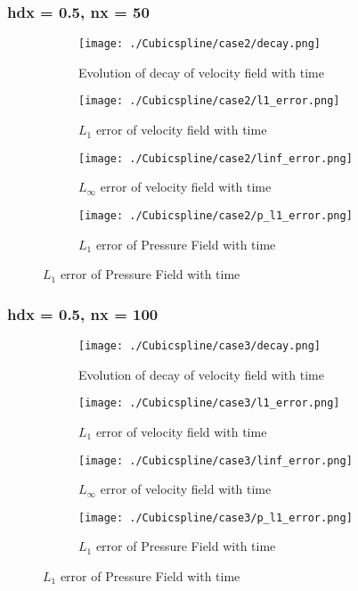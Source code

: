 \documentclass[11pt, a4paper]{article}
\begin{document}
\subsubsection{hdx = 0.5, nx = 50}
\begin{figure}[H]
\begin{subfigure}{0.48\textwidth}
\texttt{[image: ./Cubicspline/case2/decay.png]}
\caption{Evolution of decay of velocity field with time}
\end{subfigure}
\begin{subfigure}{0.48\textwidth}
\texttt{[image: ./Cubicspline/case2/l1\_error.png]}
\caption{$L_1$ error of velocity field with time}
\end{subfigure}
\medskip
\begin{subfigure}{0.48\textwidth}
\texttt{[image: ./Cubicspline/case2/linf\_error.png]}
\caption{$L_\infty$ error of velocity field with time}
\end{subfigure}
\begin{subfigure}{0.48\textwidth}
\texttt{[image: ./Cubicspline/case2/p\_l1\_error.png]}
\caption{$L_1$ error of Pressure Field with time}
\end{subfigure}
\end{figure}

\subsubsection{hdx = 0.5, nx = 100}
\begin{figure}[H]
\begin{subfigure}{0.48\textwidth}
\texttt{[image: ./Cubicspline/case3/decay.png]}
\caption{Evolution of decay of velocity field with time}
\end{subfigure}
\begin{subfigure}{0.48\textwidth}
\texttt{[image: ./Cubicspline/case3/l1\_error.png]}
\caption{$L_1$ error of velocity field with time}
\end{subfigure}
\medskip
\begin{subfigure}{0.48\textwidth}
\texttt{[image: ./Cubicspline/case3/linf\_error.png]}
\caption{$L_\infty$ error of velocity field with time}
\end{subfigure}
\begin{subfigure}{0.48\textwidth}
\texttt{[image: ./Cubicspline/case3/p\_l1\_error.png]}
\caption{$L_1$ error of Pressure Field with time}
\end{subfigure}
\end{figure}
\end{document}
